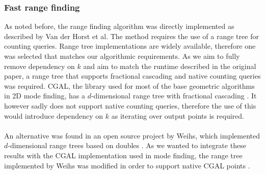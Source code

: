 \documentclass{article}
\begin{document}
\subsubsection{Fast range finding}
As noted before, the range finding algorithm was directly implemented as
described by Van der Horst et al. The method requires the use of a range tree
for counting queries. Range tree implementations are widely available,
therefore one was selected that matches our algorithmic requirements. As we aim
to fully remove dependency on $k$ and aim to match the runtime described in the
original paper, a range tree that supports fractional cascading and native
counting queries was required. CGAL, the library used for most of the base
geometric algorithms in 2D mode finding, has a $d$-dimensional range tree with
fractional cascading \cite{cgal:rangetree}. It however sadly does not support
native counting queries, therefore the use of this would introduce dependency
on $k$ as iterating over output points is required. \\\\ An alternative was
found in an open source project by Weihs, which implemented $d$-dimensional
range trees based on doubles \cite{Lucaweihs}. As we wanted to integrate these
results with the CGAL implementation used in mode finding, the range tree
implemented by Weihs was modified in order to support native CGAL points
\cite{cgal:numbertypes} \cite{cgal:foundations} \cite{cgal:dDkernel}.
\end{document}
